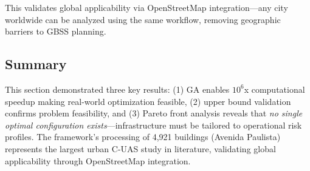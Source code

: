 This validates global applicability via OpenStreetMap integration—any city worldwide can be analyzed using the same workflow, removing geographic barriers to GBSS planning.

\subsection{Summary}

This section demonstrated three key results: (1) GA enables $10^6$x computational speedup making real-world optimization feasible, (2) upper bound validation confirms problem feasibility, and (3) Pareto front analysis reveals that \textit{no single optimal configuration exists}—infrastructure must be tailored to operational risk profiles. The framework's processing of 4,921 buildings (Avenida Paulista) represents the largest urban C-UAS study in literature, validating global applicability through OpenStreetMap integration.

